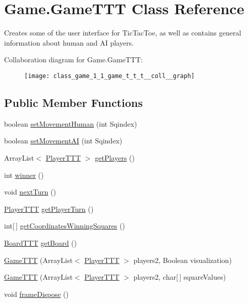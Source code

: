 \hypertarget{class_game_1_1_game_t_t_t}{}\section{Game.\+Game\+T\+T\+T Class Reference}
\label{class_game_1_1_game_t_t_t}


Creates some of the user interface for Tic\+Tac\+Toe, as well as contains general information about human and A\+I players.  




Collaboration diagram for Game.\+Game\+T\+T\+T\+:
\nopagebreak
\begin{figure}[H]
\begin{center}
\leavevmode
\texttt{[image: class\_game\_1\_1\_game\_t\_t\_t\_\_coll\_\_graph]}
\end{center}
\end{figure}
\subsection*{Public Member Functions}
\begin{DoxyCompactItemize}
\item 
boolean \hyperlink{class_game_1_1_game_t_t_t_a0791200e84a23a5dc121df19e6b6d308}{set\+Movement\+Human} (int Sqindex)
\item 
boolean \hyperlink{class_game_1_1_game_t_t_t_a85cffeaf994f8a35e3c56282b641a7a6}{set\+Movement\+A\+I} (int Sqindex)
\item 
Array\+List$<$ \hyperlink{class_player_1_1_player_t_t_t}{Player\+T\+T\+T} $>$ \hyperlink{class_game_1_1_game_t_t_t_a079a7a4f3c45ad5613a5765494c45d07}{get\+Players} ()
\item 
int \hyperlink{class_game_1_1_game_t_t_t_ac1f85bc3a5fc38f6ce84d53f36591ccd}{winner} ()
\item 
void \hyperlink{class_game_1_1_game_t_t_t_a8cbcf85e799d76e5c1b17dc54a3bc113}{next\+Turn} ()
\item 
\hyperlink{class_player_1_1_player_t_t_t}{Player\+T\+T\+T} \hyperlink{class_game_1_1_game_t_t_t_a751517c76715c85be2ff6b22ea1dbfe4}{get\+Player\+Turn} ()
\item 
int\mbox{[}$\,$\mbox{]} \hyperlink{class_game_1_1_game_t_t_t_a73acd5e17507d3c5aaca626202c61b1b}{get\+Coordinates\+Winning\+Squares} ()
\item 
\hyperlink{class_board_1_1_board_t_t_t}{Board\+T\+T\+T} \hyperlink{class_game_1_1_game_t_t_t_a2bc6494f74d04c47d2b294be71ee083f}{get\+Board} ()
\item 
\hyperlink{class_game_1_1_game_t_t_t_a730d7c27a82de9c4c5125b7fd8466ff2}{Game\+T\+T\+T} (Array\+List$<$ \hyperlink{class_player_1_1_player_t_t_t}{Player\+T\+T\+T} $>$ players2, Boolean visualization)
\item 
\hyperlink{class_game_1_1_game_t_t_t_adadd26eb4181169333b929dace529d2b}{Game\+T\+T\+T} (Array\+List$<$ \hyperlink{class_player_1_1_player_t_t_t}{Player\+T\+T\+T} $>$ players2, char\mbox{[}$\,$\mbox{]} square\+Values)
\item 
void \hyperlink{class_game_1_1_game_t_t_t_aa34199a3a29bba81669f56a08703d451}{frame\+Dispose} ()
\end{DoxyCompactItemize}
